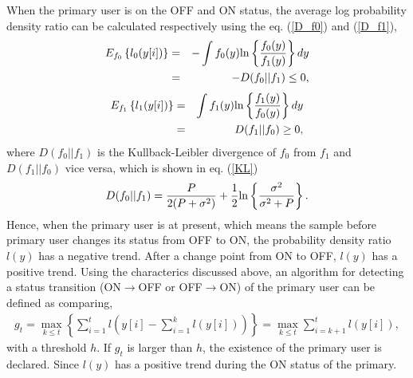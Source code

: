 When the primary user is on the OFF and ON status, the average log probability density ratio can be calculated respectively using the eq. (\ref{D_f0}) and (\ref{D_f1}),
\begin{eqnarray}
E_{f_0}\left\{l_0(y[i])\right\} &=& -\int f_0(y){\rm ln}\left\{\frac{f_0(y)}{f_1(y)}\right\}dy \nonumber \\ 
&=&-D(f_0||f_1)\leq 0, \label{D_f0} 
\end{eqnarray}
\begin{eqnarray}
E_{f_1}\left\{l_1(y[i])\right\} &=& \int f_1(y){\rm ln}\left\{\frac{f_1(y)}{f_0(y)}\right\}dy \nonumber \\
&=& D(f_1||f_0)\geq 0 \label{D_f1},
\end{eqnarray}
where $D(f_0||f_1)$ is the Kullback-Leibler divergence of $f_0$ from $f_1$ and $D(f_1||f_0)$ vice versa, which is shown in eq. (\ref{KL})
\begin{eqnarray}
D(f_0||f_1)=\frac{P}{2(P+\sigma^2)}+\frac{1}{2}{\rm ln}\left\{\frac{\sigma^2}{\sigma^2+P}\right\}.
\label{KL}
\end{eqnarray}
Hence, when the primary user is at present, which means the sample before primary user changes its status from OFF to ON, the probability density ratio $l(y)$ has a negative trend. After a change point from ON to OFF, $l(y)$ has a positive trend.
Using the characterics discussed above, an algorithm for detecting a status transition (ON$\rightarrow$OFF or OFF$\rightarrow$ON) of the primary user can be defined as comparing,  
\begin{eqnarray}
g_t =  \max_{k \leq t}\left\{\sum_{i=1}^tl(y[i]-\sum_{i=1}^kl(y[i]))\right\}=\max_{k \leq t}\sum_{i=k+1}^tl(y[i]),
\label{Cusum}
\end{eqnarray}
with a threshold $h$. If $g_t$ is larger than $h$, the existence of the primary user is declared. Since $l(y)$ has a positive trend during the ON status of the primary.

